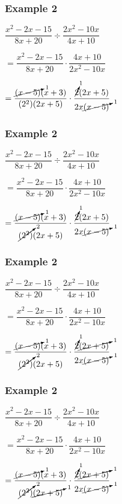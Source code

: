 \documentclass[14pt]{beamer}
\begin{document}
    \begin{frame}
    	\frametitle{Example 2}
    	$\dfrac{x^2 - 2x - 15}{8x + 20} \div \dfrac{2x^2 - 10x}{4x + 10}$ 
    	
    	\vspace{1em}$ =  \dfrac{x^2 - 2x - 15}{8x + 20} \cdot \dfrac{4x + 10}{2x^2 - 10x}$
    	
    	\vspace{1em}$ =  \dfrac{\cancelto{1}{(x-5)}(x + 3)}{(2^2) (2x + 5)} \cdot \dfrac{\cancelto{1}{2} (2x + 5)}{ 2x \cancelto{1}{(x-5)}}  $
    \end{frame}
    
     \begin{frame}
    	\frametitle{Example 2}
    	$\dfrac{x^2 - 2x - 15}{8x + 20} \div \dfrac{2x^2 - 10x}{4x + 10}$ 
    	
    	\vspace{1em}$ =  \dfrac{x^2 - 2x - 15}{8x + 20} \cdot \dfrac{4x + 10}{2x^2 - 10x}$
    	
    	\vspace{1em}$ =  \dfrac{\cancelto{1}{(x-5)}(x + 3)}{\cancelto{2}{(2^2)} (2x + 5)} \cdot \dfrac{\cancelto{1}{2} (2x + 5)}{ 2x \cancelto{1}{(x-5)}}  $
    \end{frame}

    \begin{frame}
    	\frametitle{Example 2}
    	$\dfrac{x^2 - 2x - 15}{8x + 20} \div \dfrac{2x^2 - 10x}{4x + 10}$ 
    	
    	\vspace{1em}$ =  \dfrac{x^2 - 2x - 15}{8x + 20} \cdot \dfrac{4x + 10}{2x^2 - 10x}$
    	
    	\vspace{1em}$ =  \dfrac{\cancelto{1}{(x-5)}(x + 3)}{\cancelto{2}{(2^2)} (2x + 5)} \cdot \dfrac{\cancelto{1}{2} \cancelto{1}{(2x + 5)}}{ 2x \cancelto{1}{(x-5)}}  $
    \end{frame}

    \begin{frame}
    	\frametitle{Example 2}
    	$\dfrac{x^2 - 2x - 15}{8x + 20} \div \dfrac{2x^2 - 10x}{4x + 10}$ 
    	
    	\vspace{1em}$ =  \dfrac{x^2 - 2x - 15}{8x + 20} \cdot \dfrac{4x + 10}{2x^2 - 10x}$
    	
    	\vspace{1em}$ =  \dfrac{\cancelto{1}{(x-5)}(x + 3)}{\cancelto{2}{(2^2)} \cancelto{1}{(2x + 5)}} \cdot \dfrac{\cancelto{1}{2} \cancelto{1}{(2x + 5)}}{ 2x \cancelto{1}{(x-5)}}  $
    \end{frame}
\end{document}
